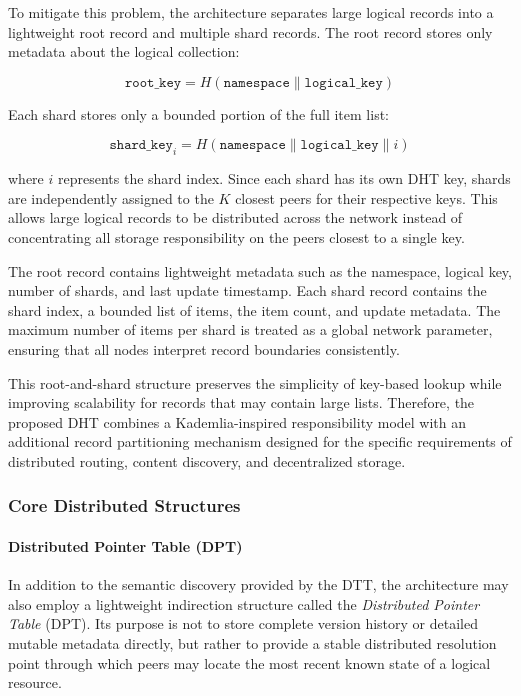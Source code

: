\documentclass[12pt,a4paper]{article}
\begin{document}
To mitigate this problem, the architecture separates large logical records into a
lightweight root record and multiple shard records. The root record stores only
metadata about the logical collection:

\[
\texttt{root\_key} = H(\texttt{namespace} \parallel \texttt{logical\_key})
\]

Each shard stores only a bounded portion of the full item list:

\[
\texttt{shard\_key}_i = H(\texttt{namespace} \parallel \texttt{logical\_key} \parallel i)
\]

where \(i\) represents the shard index. Since each shard has its own DHT key, shards
are independently assigned to the \(K\) closest peers for their respective keys. This
allows large logical records to be distributed across the network instead of
concentrating all storage responsibility on the peers closest to a single key.

The root record contains lightweight metadata such as the namespace, logical key,
number of shards, and last update timestamp. Each shard record contains the shard
index, a bounded list of items, the item count, and update metadata. The maximum
number of items per shard is treated as a global network parameter, ensuring that
all nodes interpret record boundaries consistently.

This root-and-shard structure preserves the simplicity of key-based lookup while
improving scalability for records that may contain large lists. Therefore, the
proposed DHT combines a Kademlia-inspired responsibility model with an additional
record partitioning mechanism designed for the specific requirements of distributed
routing, content discovery, and decentralized storage.


\subsubsection{Core Distributed Structures}

\paragraph{Distributed Pointer Table (DPT)}

In addition to the semantic discovery provided by the DTT, the architecture may also employ a lightweight indirection structure called the \textit{Distributed Pointer Table} (DPT). Its purpose is not to store complete version history or detailed mutable metadata directly, but rather to provide a stable distributed resolution point through which peers may locate the most recent known state of a logical resource.
\end{document}
